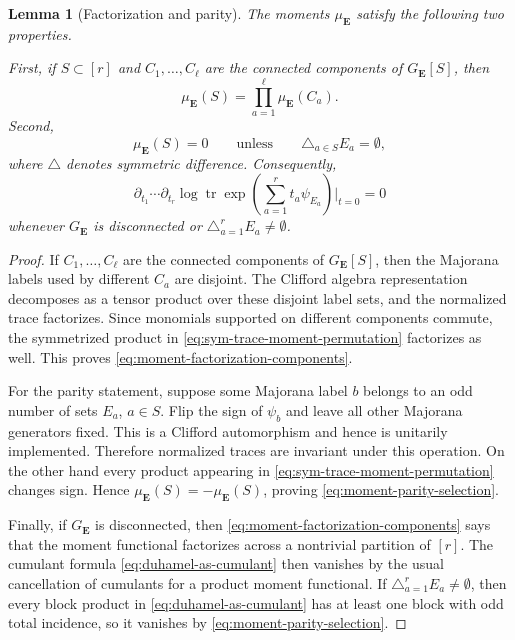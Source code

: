 \documentclass[11pt]{article}
\newtheorem{lemma}[theorem]{Lemma}
\newcommand{\tr}{\operatorname{tr}}
\begin{document}
\begin{lemma}[Factorization and parity]
  \label{lem:moment-factorization-parity}
  The moments $\mu_{\mathbf E}$ satisfy the following two properties.

  First, if $S\subset[r]$ and $C_1,\ldots,C_\ell$ are the connected components
  of $G_{\mathbf E}[S]$, then
  \begin{equation}\label{eq:moment-factorization-components}
    \mu_{\mathbf E}(S)
    =
    \prod_{a=1}^\ell \mu_{\mathbf E}(C_a).
  \end{equation}
  Second,
  \begin{equation}\label{eq:moment-parity-selection}
    \mu_{\mathbf E}(S)=0
    \qquad\text{unless}\qquad
    \triangle_{a\in S}E_a=\emptyset,
  \end{equation}
  where $\triangle$ denotes symmetric difference.
  Consequently,
  \begin{equation}\label{eq:duhamel-coeff-disconnected-or-odd-zero}
    \partial_{t_1}\cdots\partial_{t_r}
    \log\tr\exp\left(\sum_{a=1}^r t_a\psi_{E_a}\right)\bigg|_{t=0}=0
  \end{equation}
  whenever $G_{\mathbf E}$ is disconnected or
  $\triangle_{a=1}^rE_a\neq\emptyset$.
\end{lemma}

\begin{proof}
  If $C_1,\ldots,C_\ell$ are the connected components of $G_{\mathbf E}[S]$,
  then the Majorana labels used by different $C_a$ are disjoint.  The Clifford
  algebra representation decomposes as a tensor product over these disjoint
  label sets, and the normalized trace factorizes.  Since monomials supported
  on different components commute, the symmetrized product in
  \eqref{eq:sym-trace-moment-permutation} factorizes as well.  This proves
  \eqref{eq:moment-factorization-components}.

  For the parity statement, suppose some Majorana label $b$ belongs to an odd
  number of sets $E_a$, $a\in S$.  Flip the sign of $\psi_b$ and leave all other
  Majorana generators fixed.  This is a Clifford automorphism and hence is
  unitarily implemented.  Therefore normalized traces are invariant under this
  operation.  On the other hand every product appearing in
  \eqref{eq:sym-trace-moment-permutation} changes sign.  Hence
  $\mu_{\mathbf E}(S)=-\mu_{\mathbf E}(S)$, proving
  \eqref{eq:moment-parity-selection}.

  Finally, if $G_{\mathbf E}$ is disconnected, then
  \eqref{eq:moment-factorization-components} says that the moment functional
  factorizes across a nontrivial partition of $[r]$.  The cumulant formula
  \eqref{eq:duhamel-as-cumulant} then vanishes by the usual cancellation of
  cumulants for a product moment functional.  If
  $\triangle_{a=1}^rE_a\neq\emptyset$, then every block product in
  \eqref{eq:duhamel-as-cumulant} has at least one block with odd total
  incidence, so it vanishes by \eqref{eq:moment-parity-selection}.
\end{proof}
\end{document}
